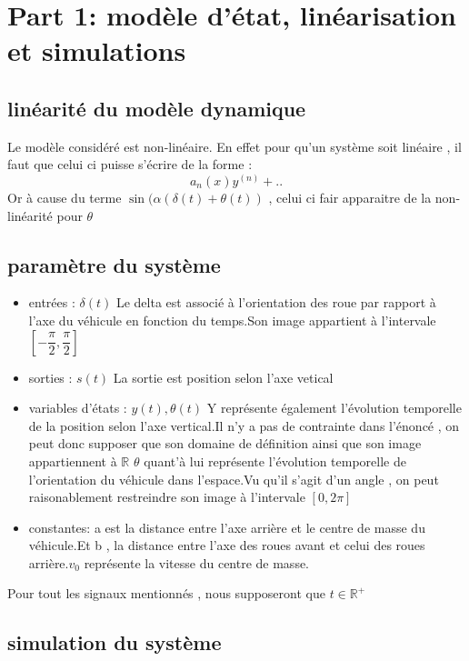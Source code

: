 \documentclass[11pt,a4paper]{article}
\begin{document}

\section{Part 1: modèle d'état, linéarisation et simulations}
\subsection{linéarité du modèle dynamique}
Le modèle considéré est non-linéaire.
En effet pour qu'un système soit linéaire , il faut que celui ci puisse s'écrire de la forme :
$$ a_n (x) y^{(n)}+ ..$$
Or à cause du terme $\sin(\alpha(\delta(t)+\theta(t))$ , celui ci fair apparaitre de la non-linéarité pour $\theta$
\subsection{paramètre du système}
\begin{itemize}
    \item entrées : $\delta(t)$
    Le delta est associé à l'orientation des roue par rapport à l'axe du véhicule en fonction du temps.Son image appartient à l'intervale $[-\dfrac{\pi}{2},\dfrac{\pi}{2}]$
    \item sorties : $s(t)$
    La sortie est position selon l'axe vetical
    \item variables d'états : $y(t),\theta(t)$
    Y représente également l'évolution temporelle de la position selon l'axe vertical.Il n'y a pas de contrainte dans l'énoncé , on peut donc supposer que son domaine de définition ainsi que son image appartiennent à $\mathbb{R}$
    $\theta$ quant'à lui représente l'évolution temporelle de l'orientation du véhicule dans l'espace.Vu qu'il s'agit d'un angle , on peut raisonablement restreindre son image à l'intervale $[ 0,2\pi]$
    \item constantes: a est la distance entre l'axe arrière et le centre de masse du véhicule.Et b , la distance entre l'axe des roues avant et celui des roues arrière.$v_0$ représente la vitesse du centre de masse.
\end{itemize}
Pour tout les signaux mentionnés , nous supposeront que $t \in \mathbb{R}^+$
\subsection{simulation du système}
\end{document}
